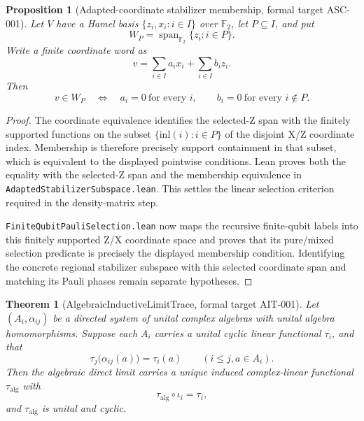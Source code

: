 \documentclass{article}
\newtheorem{proposition}[definition]{Proposition}
\newtheorem{theorem}[definition]{Theorem}
\begin{document}
\begin{proposition}[Adapted-coordinate stabilizer membership, formal target
ASC-001]
\label{prop:adapted_coordinate_stabilizer_membership}
Let $V$ have a Hamel basis $\{z_i,x_i:i\in I\}$ over $\mathbb F_2$, let
$P\subseteq I$, and put
\begin{equation*}
  W_P=\operatorname{span}_{\mathbb F_2}\{z_i:i\in P\}.
\end{equation*}
Write a finite coordinate word as
\begin{equation*}
  v=\sum_{i\in I} a_i x_i+\sum_{i\in I}b_i z_i.
\end{equation*}
Then
\begin{equation*}
  v\in W_P
  \quad\Longleftrightarrow\quad
  a_i=0\ \text{for every }i,\qquad
  b_i=0\ \text{for every }i\notin P.
\end{equation*}
\end{proposition}

\begin{proof}
The coordinate equivalence identifies the selected-Z span with the finitely
supported functions on the subset $\{\mathrm{inl}(i):i\in P\}$ of the
disjoint X/Z coordinate index.  Membership is therefore precisely support
containment in that subset, which is equivalent to the displayed pointwise
conditions.  Lean proves both the equality with the selected-Z span and the
membership equivalence in \texttt{AdaptedStabilizerSubspace.lean}.  This
settles the linear selection criterion required in the density-matrix step.

\texttt{FiniteQubitPauliSelection.lean} now maps the recursive finite-qubit
labels into this finitely supported Z/X coordinate space and proves that its
pure/mixed selection predicate is precisely the displayed membership condition.
Identifying the concrete regional stabilizer subspace with this selected
coordinate span and matching its Pauli phases remain separate hypotheses.
\end{proof}

\begin{theorem}[AlgebraicInductiveLimitTrace, formal target AIT-001]
Let \((A_i,\alpha_{ij})\) be a directed system of unital complex algebras
with unital algebra homomorphisms.  Suppose each \(A_i\) carries a unital
cyclic linear functional \(\tau_i\), and that
\begin{equation*}
  \tau_j\bigl(\alpha_{ij}(a)\bigr)=\tau_i(a)
  \qquad (i\leq j, a\in A_i).
\end{equation*}
Then the algebraic direct limit carries a unique induced complex-linear
functional \(\tau_{\mathrm{alg}}\) with
\begin{equation*}
  \tau_{\mathrm{alg}}\circ\iota_i=\tau_i,
\end{equation*}
and \(\tau_{\mathrm{alg}}\) is unital and cyclic.
\end{theorem}
\end{document}
